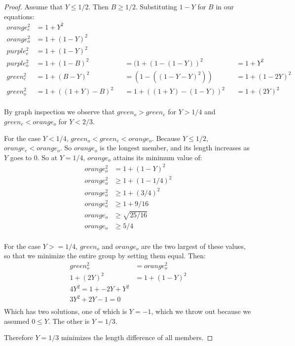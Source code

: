 \documentclass[11pt]{article}
\begin{document}
\begin{proof}
   Assume that $Y \leq 1/2$. Then $B \geq 1/2$. Substituting $1 - Y$ for $B$ in our equations:
 \begin{align*}
   orange_e^2 &= 1 + Y^2 \\
 orange_o^2 &= 1 + (1-Y)^2 \\
 purple_e^2 &=  1 + (1-Y)^2 \\
 purple_o^2 &=   1+ (1-B)^2 & &= (1 + (1 - (1 - Y))^2 & & = 1 + Y^2 \\
 green_e^2 &=  1 + (B - Y)^2 & &= (1 - ((1 - Y - Y)^2)) & &= 1 + (1 - 2Y)^2\\ 
 green_o^2 &= 1 + ((1+Y) - B)^2 & &= 1 + ((1+Y) - (1 - Y))^2 & &= 1 + (2Y)^2 \\
 \end{align*}

 By graph inspection we observe that $green_o > green_e$ for $Y > 1/4$ and $green_e < orange_o$ for $Y < 2/3$.

 For the case $Y < 1/4$, $green_o < green_e < orange_o$. Because $Y \leq 1/2$, $orange_e < orange_o$. So $orange_o$
 is the longest member, and its length increases as $Y$ goes to $0$. So at $Y = 1/4$, $orange_o$ attains its
 minimum value of:
\begin{align*}
 orange_o^2 &= 1 + (1-Y)^2 \\
 orange_o^2 &\geq 1 + (1-1/4)^2 \\
 orange_o^2 &\geq 1 + (3/4)^2 \\
 orange_o^2 &\geq 1 + 9/16 \\
 orange_o &\geq \sqrt{25/16} \\
    orange_o &\geq 5/4 \\ 
 \end{align*}
  
For the case $Y >= 1/4$, $green_o$ and $orange_o$ are the two largest of these values, so that
we minimize the entire group by setting them equal.
 Then:
\begin{align*}
  green_o^2 &= orange_o^2 \\
  1 + (2Y)^2 &= 1 + (1-Y)^2 \\
  4Y^2 = 1 + -2Y + Y^2 \\
  3Y^2 + 2Y - 1 = 0 \\
\end{align*}
Which has two solutions, one of which is $Y = -1$, which we throw out because we assumed $0 \leq Y$. The other is $Y = 1/3$.

Therefore $Y = 1/3$ minimizes the length difference of all members.



\end{proof}
\end{document}
